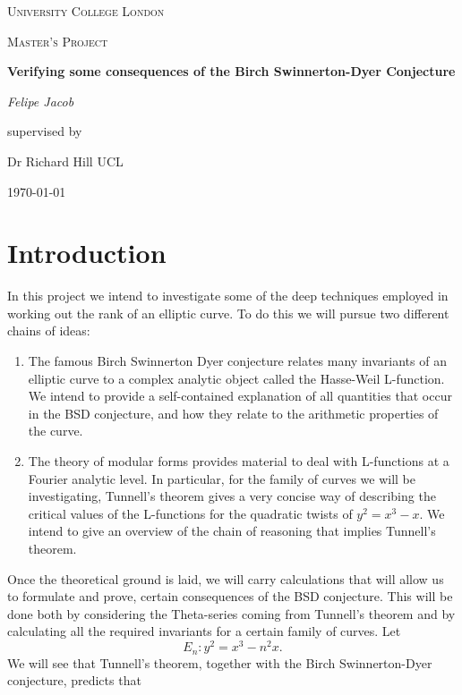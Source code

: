 \documentclass[12pt, a4paper]{report}
\begin{document}
\begin{titlepage}
	\centering
	{\scshape\LARGE University College London \par}
	\vspace{1cm}
	{\scshape\Large Master's Project \par}
	\vspace{1.5cm}
	{\huge\bfseries Verifying some consequences of the Birch Swinnerton-Dyer
    Conjecture \par}
	\vspace{2cm}
	{\Large\itshape Felipe Jacob\par}
	\vfill
	supervised by\par
	Dr Richard Hill \textsc{UCL}

	\vfill

	{\large \today\par}
\end{titlepage}

\tableofcontents
\pagebreak


\chapter{Introduction}

In this project we intend to investigate some of the deep techniques employed in
working out the rank of an elliptic curve. To do this we will pursue two different
chains of ideas:
\begin{enumerate}
\item The famous Birch Swinnerton Dyer conjecture relates many invariants of an
  elliptic curve to a complex analytic object called the Hasse-Weil L-function.
  We intend to provide a self-contained explanation of all quantities that occur
  in the BSD conjecture, and how they relate to the arithmetic properties of the
  curve.
\item The theory of modular forms provides material to deal with L-functions at
  a Fourier analytic level. In particular, for the family of curves we will be
  investigating, Tunnell's theorem gives a very concise way of describing the
  critical values of the L-functions for the quadratic twists of $y^2 = x^3-x$.
  We intend to give an overview of the chain of reasoning that implies Tunnell's theorem.
\end{enumerate}

Once the theoretical ground is laid, we will carry calculations that will allow
us to formulate and prove, certain consequences of the BSD
conjecture. This will be done both by considering the Theta-series coming from
Tunnell's theorem and by calculating all the required invariants for a certain
family of curves. Let
\[E_n : y^2 = x^3 - n^2 x.\]
We will see that Tunnell's theorem, together with the Birch Swinnerton-Dyer
conjecture, predicts that
\end{document}

